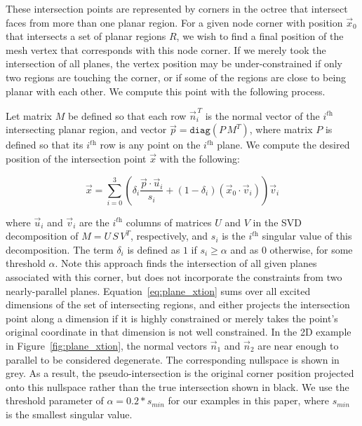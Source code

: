 \documentclass[12pt,onecolumn,oneside]{book}
\begin{document}
These intersection points are represented by corners in the octree that intersect faces from more than one planar region.  For a given node corner with position $\vec{x}_0$ that intersects a set of planar regions $R$, we wish to find a final position of the mesh vertex that corresponds with this node corner.  If we merely took the intersection of all planes, the vertex position may be under-constrained if only two regions are touching the corner, or if some of the regions are close to being planar with each other.  
We compute this point with the following process.

Let matrix $M$ be defined so that each row $\vec{n}_i^{\,T}$ is the normal vector of the $i^{\textit{th}}$ intersecting planar region, and vector $\vec{p} = \texttt{diag}(P\,M^T)$, where matrix $P$ is defined so that its $i^{\textit{th}}$ row is any point on the $i^{\textit{th}}$ plane.  We compute the desired position of the intersection point $\vec{x}$ with the following:

\begin{equation}
	\vec{x} = \sum_{i = 0}^{3} \left( \delta_i \dfrac{\vec{p} \cdot \vec{u}_i}{s_i} + (1-\delta_i) ( \vec{x}_0 \cdot \vec{v}_i ) \right) \vec{v}_i
	\label{eq:plane_xtion}
\end{equation}

where $\vec{u}_i$ and $\vec{v}_i$ are the $i^{\textit{th}}$ columns of matrices $U$ and $V$ in the SVD decomposition of $M = U \, S \, V^T$, respectively, and $s_i$ is the $i^{\textit{th}}$ singular value of this decomposition.  The term $\delta_i$ is defined as $1$ if $s_i \geq \alpha$ and as $0$ otherwise, for some threshold $\alpha$.  Note this approach finds the intersection of all given planes associated with this corner, but does not incorporate the constraints from two nearly-parallel planes.  Equation~\ref{eq:plane_xtion} sums over all excited dimensions of the set of intersecting regions, and either projects the intersection point along a dimension if it is highly constrained or merely takes the point's original coordinate in that dimension is not well constrained.  In the 2D example in Figure~\ref{fig:plane_xtion}, the normal vectors $\vec{n}_1$ and $\vec{n}_2$ are near enough to parallel to be considered degenerate.  The corresponding nullspace is shown in grey.  As a result, the pseudo-intersection is the original corner position projected onto this nullspace rather than the true intersection shown in black. We use the threshold parameter of $\alpha=0.2 * s_{min}$ for our examples in this paper, where $s_{min}$ is the smallest singular value.
\end{document}
